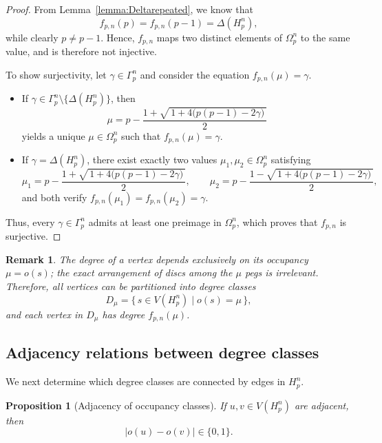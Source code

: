 \documentclass[letterpaper,12pt]{article}
\newtheorem{proposition}{Proposition}
\newtheorem{remark}{Remark}
\begin{document}
\begin{proof}
From Lemma~\ref{lemma:Deltarepeated}, we know that
\[
f_{p,n}(p) = f_{p,n}(p - 1) = \Delta(H_p^n),
\]
while clearly $p \neq p - 1$. Hence, $f_{p,n}$ maps two distinct elements of $\Omega_p^n$ to the same value, and is therefore not injective.

To show surjectivity, let $\gamma \in \Gamma_p^n$ and consider the equation $f_{p,n}(\mu) = \gamma$.  

\begin{itemize}
    \item If $\gamma \in \Gamma_p^n \setminus \{\Delta(H_p^n)\}$, then
    \[
    \mu = p - \frac{1 + \sqrt{\,1 + 4\bigl(p(p - 1) - 2\gamma\bigr)\,}}{2}
    \]
    yields a unique $\mu \in \Omega_p^n$ such that $f_{p,n}(\mu) = \gamma$.
    
    \item If $\gamma = \Delta(H_p^n)$, there exist exactly two values $\mu_1, \mu_2 \in \Omega_p^n$ satisfying
    \[
    \mu_1 = p - \frac{1 + \sqrt{\,1 + 4\bigl(p(p - 1) - 2\gamma\bigr)\,}}{2}, 
    \qquad
    \mu_2 = p - \frac{1 - \sqrt{\,1 + 4\bigl(p(p - 1) - 2\gamma\bigr)\,}}{2},
    \]
    and both verify $f_{p,n}(\mu_1) = f_{p,n}(\mu_2) = \gamma$.
\end{itemize}

Thus, every $\gamma \in \Gamma_p^n$ admits at least one preimage in $\Omega_p^n$, which proves that $f_{p,n}$ is surjective.\qedhere
\end{proof}


\begin{remark}
The degree of a vertex depends exclusively on its occupancy \(\mu=o(s)\); the exact arrangement of discs among the \(\mu\) pegs is irrelevant.  
Therefore, all vertices can be partitioned into \emph{degree classes}
\[
D_\mu=\{\,s\in V(H_p^n)\mid o(s)=\mu\,\},
\]
and each vertex in \(D_\mu\) has degree \(f_{p,n}(\mu)\).
\end{remark}





\subsection{Adjacency relations between degree classes}

We next determine which degree classes are connected by edges in \(H_p^n\).

\begin{proposition}[Adjacency of occupancy classes]
\label{prop:adj_occ}
If \(u,v\in V(H_p^n)\) are adjacent, then
\[
|o(u)-o(v)|\in\{0,1\}.
\]
\end{proposition}
\end{document}
